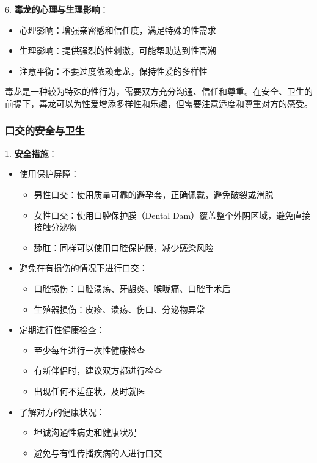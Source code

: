 \documentclass[12pt,UTF8]{ctexbook}
\begin{document}
6. \textbf{毒龙的心理与生理影响}：
  \begin{itemize}
  \item 心理影响：增强亲密感和信任度，满足特殊的性需求
  \item 生理影响：提供强烈的性刺激，可能帮助达到性高潮
  \item 注意平衡：不要过度依赖毒龙，保持性爱的多样性
  \end{itemize}

毒龙是一种较为特殊的性行为，需要双方充分沟通、信任和尊重。在安全、卫生的前提下，毒龙可以为性爱增添多样性和乐趣，但需要注意适度和尊重对方的感受。

\subsubsection{口交的安全与卫生}

1. \textbf{安全措施}：
  \begin{itemize}
  \item 使用保护屏障：
    \begin{itemize}
    \item 男性口交：使用质量可靠的避孕套，正确佩戴，避免破裂或滑脱
    \item 女性口交：使用口腔保护膜（Dental Dam）覆盖整个外阴区域，避免直接接触分泌物
    \item 舔肛：同样可以使用口腔保护膜，减少感染风险
    \end{itemize}
  \item 避免在有损伤的情况下进行口交：
    \begin{itemize}
    \item 口腔损伤：口腔溃疡、牙龈炎、喉咙痛、口腔手术后
    \item 生殖器损伤：皮疹、溃疡、伤口、分泌物异常
    \end{itemize}
  \item 定期进行性健康检查：
    \begin{itemize}
    \item 至少每年进行一次性健康检查
    \item 有新伴侣时，建议双方都进行检查
    \item 出现任何不适症状，及时就医
    \end{itemize}
  \item 了解对方的健康状况：
    \begin{itemize}
    \item 坦诚沟通性病史和健康状况
    \item 避免与有性传播疾病的人进行口交
    \end{itemize}
  \end{itemize}
\end{document}
